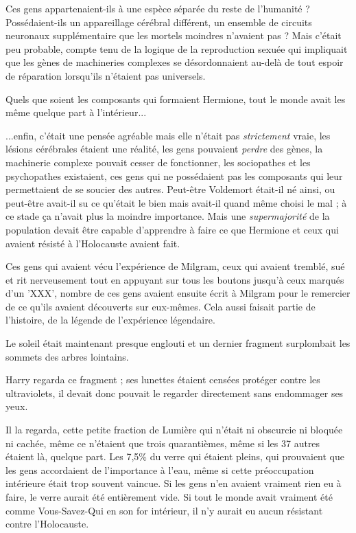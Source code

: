 Ces gens appartenaient-ils à une espèce séparée du reste de l'humanité ? Possédaient-ils un appareillage cérébral différent, un ensemble de circuits neuronaux supplémentaire que les mortels moindres n'avaient pas ? Mais c'était peu probable, compte tenu de la logique de la reproduction sexuée qui impliquait que les gènes de machineries complexes se désordonnaient au-delà de tout espoir de réparation lorsqu'ils n'étaient pas universels.

Quels que soient les composants qui formaient Hermione, tout le monde avait les même quelque part à l'intérieur...

...enfin, c'était une pensée agréable mais elle n'était pas \emph{strictement}  vraie, les lésions cérébrales étaient une réalité, les gens pouvaient \emph{perdre } des gènes, la machinerie complexe pouvait cesser de fonctionner, les sociopathes et les psychopathes existaient, ces gens qui ne possédaient pas les composants qui leur permettaient de se soucier des autres. Peut-être Voldemort était-il né ainsi, ou peut-être avait-il su ce qu'était le bien mais avait-il quand même choisi le mal ; à ce stade ça n'avait plus la moindre importance. Mais une \emph{supermajorité}  de la population devait être capable d'apprendre à faire ce que Hermione et ceux qui avaient résisté à l'Holocauste avaient fait.

Ces gens qui avaient vécu l'expérience de Milgram, ceux qui avaient tremblé, sué et rit nerveusement tout en appuyant sur tous les boutons jusqu'à ceux marqués d'un 'XXX', nombre de ces gens avaient ensuite écrit à Milgram pour le remercier de ce qu'ils avaient découverts sur eux-mêmes. Cela aussi faisait partie de l'histoire, de la légende de l'expérience légendaire.

Le soleil était maintenant presque englouti et un dernier fragment surplombait les sommets des arbres lointains.

Harry regarda ce fragment ; ses lunettes étaient censées protéger contre les ultraviolets, il devait donc pouvait le regarder directement sans endommager ses yeux.

Il la regarda, cette petite fraction de Lumière qui n'était ni obscurcie ni bloquée ni cachée, même ce n'étaient que trois quarantièmes, même si les 37 autres étaient là, quelque part. Les 7,5\% du verre qui étaient pleins, qui prouvaient que les gens accordaient de l'importance à l'eau, même si cette préoccupation intérieure était trop souvent vaincue. Si les gens n'en avaient vraiment rien eu à faire, le verre aurait été entièrement vide. Si tout le monde avait vraiment été comme Vous-Savez-Qui en son for intérieur, il n'y aurait eu aucun résistant contre l'Holocauste.

